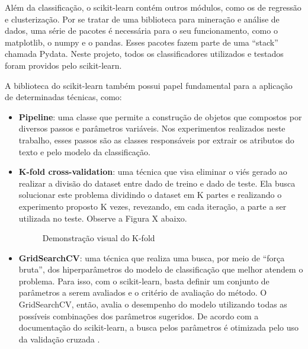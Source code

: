 Além da classificação, o scikit-learn contém outros módulos, como os de regressão e clusterização. Por se tratar de uma biblioteca para mineração e análise de dados, uma série de pacotes é necessária para o seu funcionamento, como o matplotlib, o numpy e o pandas. Esses pacotes fazem parte de uma “stack” chamada Pydata. Neste projeto, todos os classificadores utilizados e testados foram providos pelo scikit-learn.

A biblioteca do scikit-learn também possui papel fundamental para a aplicação de determinadas técnicas, como:

\begin{itemize}
    \item \textbf{Pipeline}: uma classe que permite a construção de objetos que compostos por diversos passos e parâmetros variáveis. Nos experimentos realizados neste trabalho, esses passos são as classes responsáveis por extrair os atributos do texto e pelo modelo da classificação.
    \item \textbf{K-fold cross-validation}: uma técnica que visa eliminar o viés gerado ao realizar a divisão do dataset entre dado de treino e dado de teste. Ela busca solucionar este problema dividindo o dataset em K partes e realizando o experimento proposto K vezes, revezando, em cada iteração, a parte a ser utilizada no teste. Observe a Figura X abaixo.
    
    \begin{figure}[!htb]
        \caption{\label{fig:my-label} Demonstração visual do K-fold}
    \end{figure}
    
   \item \textbf{GridSearchCV}: uma técnica que realiza uma busca, por meio de “força bruta”, dos hiperparâmetros do modelo de classificação que melhor atendem o problema. Para isso, com o scikit-learn, basta definir um conjunto de parâmetros a serem avaliados e o critério de avaliação do método. O GridSearchCV, então, avalia o desempenho do modelo utilizando todas as possíveis combinações dos parâmetros sugeridos. De acordo com a documentação do scikit-learn, a busca pelos parâmetros é otimizada pelo uso da validação cruzada \cite{scikit-learn}.
\end{itemize}
